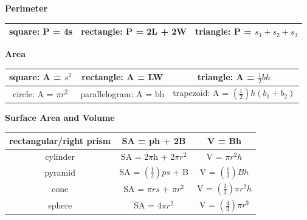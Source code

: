 \documentclass[12pt]{article}
\begin{document}


\vspace{0.8 cm}
\textbf{Perimeter}\\
\begin{tabular}{ |c| |c| |c| }
\hline
square: P = 4s & rectangle: P = 2L + 2W & triangle: P = $s_1 + s_2 +s_3$ \\
\hline
\end{tabular}

\vspace{0.8 cm}
\textbf{Area}\\
\begin{tabular}{ |c| |c| |c| }
\hline
square: A = $s^2$ & rectangle: A = LW & triangle: A = $\frac{1}{2}bh$ \\
\hline
circle: A = $\pi r^2$ & parallelogram: A = bh & trapezoid: A = $ \left(\frac{1}{2} \right)h(b_1 + b_2)$ \\
\hline

\end{tabular}

\vspace{0.8 cm}
\textbf{Surface Area and Volume}\\
\begin{tabular}{ |c| |c| |c| }
\hline
rectangular/right prism & SA = ph + 2B & V = Bh  \\ 
\hline
cylinder & SA = 2$\pi$h + 2$\pi r^2$ &  V = $\pi r^2h$ \\ 
\hline
pyramid & SA = $\left(\frac{1}{2}\right)ps$ + B & V = $\left(\frac{1}{3}\right)Bh$ \\ 
\hline
cone & SA = $\pi rs$ + $\pi r^2$ & V = $\left(\frac{1}{3}\right)\pi r^2h$ \\
\hline 
sphere & SA = 4$\pi r^2$ & V = $ \left(\frac{4}{3} \right)\pi r^3$ \\
\hline
\end{tabular}
\end{document}
